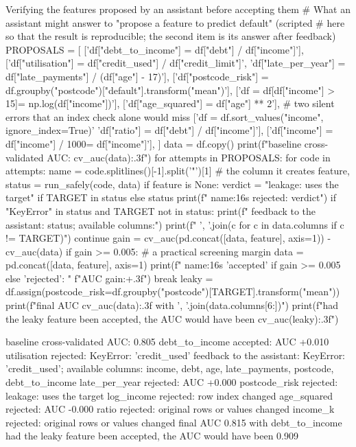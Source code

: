 \begin{pylisting}[label={lst:assistant}]{Verifying the features proposed by an assistant before accepting them}
# What an assistant might answer to "propose a feature to predict default" (scripted
# here so that the result is reproducible; the second item is its answer after feedback)
PROPOSALS = [
    ['df["debt_to_income"] = df["debt"] / df["income"]'],
    ['df["utilisation"] = df["credit_used"] / df["credit_limit"]',
     'df["late_per_year"] = df["late_payments"] / (df["age"] - 17)'],
    ['df["postcode_risk"] = df.groupby("postcode")["default"].transform("mean")'],
    ['df = df[df["income"] > 15] = np.log(df["income"])'],
    ['df["age_squared"] = df["age"] ** 2'],
    # two silent errors that an index check alone would miss
    ['df = df.sort_values("income", ignore_index=True)\n'
     'df["ratio"] = df["debt"] / df["income"]'],
    ['df["income"] = df["income"] / 1000\ndf["income_k"] = df["income"]'],
]
data = df.copy()
print(f"baseline cross-validated AUC: {cv_auc(data):.3f}")
for attempts in PROPOSALS:
    for code in attempts:
        name = code.splitlines()[-1].split('"')[1]          # the column it creates
        feature, status = run_safely(code, data)
        if feature is None:
            verdict = "leakage: uses the target" if TARGET in status else status
            print(f"  {name:16s} rejected: {verdict}")
            if "KeyError" in status and TARGET not in status:
                print(f"    feedback to the assistant: {status}; available columns:")
                print(f"    {', '.join(c for c in data.columns if c != TARGET)}")
            continue
        gain = cv_auc(pd.concat([data, feature], axis=1)) - cv_auc(data)
        if gain >= 0.005:                    # a practical screening margin
            data = pd.concat([data, feature], axis=1)
        print(f"  {name:16s} {'accepted' if gain >= 0.005 else 'rejected'}: "
              f"AUC {gain:+.3f}")
        break
leaky = df.assign(postcode_risk=df.groupby("postcode")[TARGET].transform("mean"))
print(f"final AUC {cv_auc(data):.3f} with {', '.join(data.columns[6:])}")
print(f"had the leaky feature been accepted, the AUC would have been {cv_auc(leaky):.3f}")
\end{pylisting}
\begin{pyoutput}
baseline cross-validated AUC: 0.805
  debt_to_income   accepted: AUC +0.010
  utilisation      rejected: KeyError: 'credit_used'
    feedback to the assistant: KeyError: 'credit_used'; available columns:
    income, debt, age, late_payments, postcode, debt_to_income
  late_per_year    rejected: AUC +0.000
  postcode_risk    rejected: leakage: uses the target
  log_income       rejected: row index changed
  age_squared      rejected: AUC -0.000
  ratio            rejected: original rows or values changed
  income_k         rejected: original rows or values changed
final AUC 0.815 with debt_to_income
had the leaky feature been accepted, the AUC would have been 0.909
\end{pyoutput}

